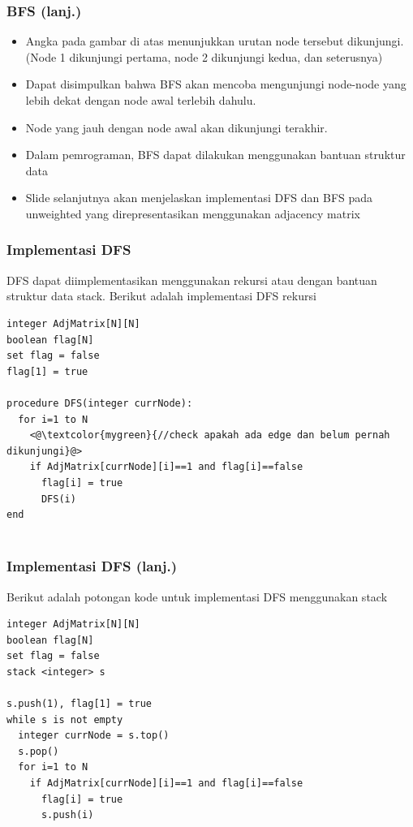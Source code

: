 \begin{frame}
\frametitle{BFS (lanj.)}
\begin{itemize}
  \item Angka pada gambar di atas menunjukkan urutan node tersebut dikunjungi. (Node 1 dikunjungi pertama, node 2 dikunjungi kedua, dan seterusnya)
  \item Dapat disimpulkan bahwa BFS akan mencoba mengunjungi node-node yang lebih dekat dengan node awal terlebih dahulu.
  \item Node yang jauh dengan node awal akan dikunjungi terakhir.
  \item Dalam pemrograman, BFS dapat dilakukan menggunakan bantuan struktur data 
  \item Slide selanjutnya akan menjelaskan implementasi DFS dan BFS pada unweighted \fgraph yang direpresentasikan menggunakan adjacency matrix
\end{itemize}
\end{frame}

\begin{frame}[fragile]
\frametitle{Implementasi DFS}
DFS dapat diimplementasikan menggunakan rekursi atau dengan bantuan struktur data stack. Berikut adalah implementasi DFS rekursi\newline
\begin{lstlisting}
integer AdjMatrix[N][N]
boolean flag[N]
set flag = false
flag[1] = true

procedure DFS(integer currNode):
  for i=1 to N
    <@\textcolor{mygreen}{//check apakah ada edge dan belum pernah dikunjungi}@>
    if AdjMatrix[currNode][i]==1 and flag[i]==false
      flag[i] = true
      DFS(i)
end
        
\end{lstlisting}
\end{frame}

\begin{frame}[fragile]
\frametitle{Implementasi DFS (lanj.)}
Berikut adalah potongan kode untuk implementasi DFS menggunakan stack\newline
\begin{lstlisting}
integer AdjMatrix[N][N]
boolean flag[N]
set flag = false
stack <integer> s

s.push(1), flag[1] = true
while s is not empty
  integer currNode = s.top()
  s.pop()
  for i=1 to N
    if AdjMatrix[currNode][i]==1 and flag[i]==false
      flag[i] = true
      s.push(i)
        
\end{lstlisting}
\end{frame}

